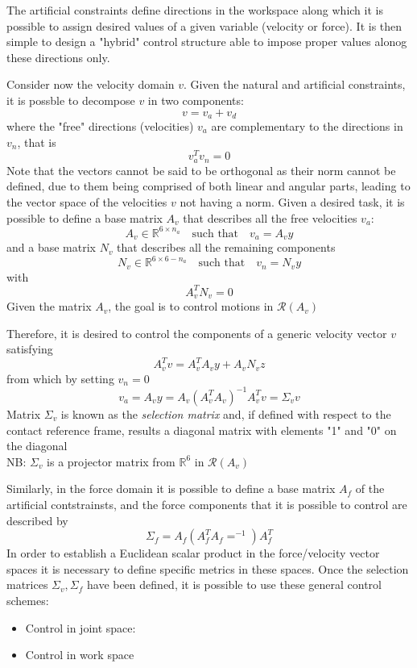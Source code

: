 \documentclass{book}
\begin{document}
The artificial constraints define directions in the workspace along which it is possible to assign desired values of a given variable (velocity or force). It is then simple to design a "hybrid" control structure able to impose proper values alonog these directions only. 

Consider now the velocity domain $v$. Given the natural and artificial constraints, it is possble to decompose $v$ in two components:
\[
    v=v_a+v_d
\]
where the "free" directions (velocities) $v_a$ are complementary to the directions in $v_n$, that is 
\[
    v_a^Tv_n=0
\]
Note that the vectors cannot be said to be orthogonal as their norm cannot be defined, due to them being comprised of both linear and angular parts, leading to the vector space of the velocities $v$ not having a norm. Given a desired task, it is possible to define a base matrix $A_v$ that describes all the free velocities $v_a$:
\[
    A_v\in\mathbb{R}^{6\times n_a} \quad \text{such that} \quad v_a=A_vy 
\]
and a base matrix $N_v$ that describes all the remaining components 
\[
    N_v\in\mathbb{R}^{6\times 6-n_a} \quad \text{such that} \quad v_n=N_vy 
\]
with
\[
    A_v^TN_v=0    
\]
Given the matrix $A_v$, the goal is to control motions in $\mathcal{R}(A_v)$

Therefore, it is desired to control the components of a generic velocity vector $v$ satisfying 
\[
    A_v^Tv=A_v^TA_vy+A_vN_vz
\]
from which by setting $v_n=0$  
\[
    v_a = A_vy=A_v(A_v^TA_v)^{-1}A_v^Tv=\Sigma_vv
\]
Matrix $\Sigma_v$ is known as the \emph{selection matrix} and, if defined with respect to the contact reference frame, results a diagonal matrix with elements "1" and "0" on the diagonal\\
NB: $\Sigma_v$ is a projector matrix from $\mathbb{R}^6$ in $\mathcal{R}(A_v)$

Similarly, in the force domain it is possible to define a base matrix $A_f$ of the artificial contstrainsts, and the force components that it is possible to control are described by 
\[
    \Sigma_f=A_f(A_f^TA_f=^{-1})A_f^T
\]
In order to establish a Euclidean scalar product in the force/velocity vector spaces it is necessary to define specific metrics in these spaces. 
Once the selection matrices $\Sigma_v,\Sigma_f$ have been defined, it is possible to use these general control schemes: 
\begin{itemize}
    \item Control in joint space: 
    \item Control in work space 
\end{itemize}
\end{document}
